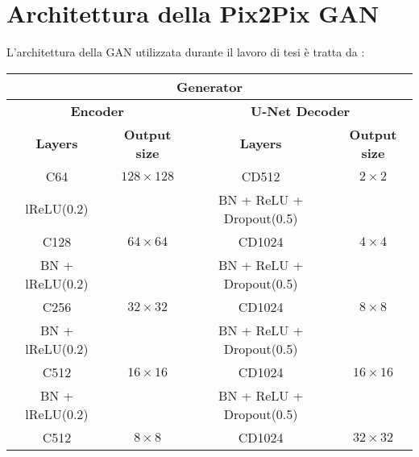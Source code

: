\section{Architettura della Pix2Pix GAN}
L'architettura della GAN utilizzata durante il lavoro di tesi è tratta da %
\cite{isola2016image}:
        \begin{table}[!h]
            \centering
            \begin{tabular}{|c|c||c|c|}
                \hline
                \multicolumn{4}{|c|}{\textbf{Generator}} \rule[-3mm]{0mm}{8mm}\\
                \hline \hline
                \multicolumn{2}{|c||}{\textbf{Encoder}} & 
                \multicolumn{2}{|c|}{\textbf{U-Net Decoder}} \rule[-3mm]{0mm}{8mm}\\
                \hline \hline
                \rule[-3mm]{0mm}{8mm}
                \textbf{Layers} & \textbf{Output size} & \textbf{Layers} & \textbf{Output size}\\
                \hline
                \rule[-3mm]{0mm}{8mm}
                C64 & $128 \times 128$      & CD512 & $2 \times 2$ \\
                lReLU(0.2)      &                & BN + ReLU + Dropout(0.5) & \\
                \hline
                \rule[-3mm]{0mm}{8mm}
                C128 & $64 \times 64$       & CD1024 & $4 \times 4$ \\
                BN + lReLU(0.2) &                & BN + ReLU + Dropout(0.5) & \\
                \hline
                \rule[-3mm]{0mm}{8mm}
                C256 & $32 \times 32$       & CD1024 & $8 \times 8$ \\
                BN + lReLU(0.2) &                & BN + ReLU + Dropout(0.5) & \\
                \hline
                \rule[-3mm]{0mm}{8mm}
                C512 & $16 \times 16$       & CD1024 & $16 \times 16$ \\
                BN + lReLU(0.2) &                & BN + ReLU + Dropout(0.5) & \\
                \hline
                \rule[-3mm]{0mm}{8mm}
                C512 & $8 \times 8$         & CD1024 & $32 \times 32$ \\

\end{tabular}
\end{table}
